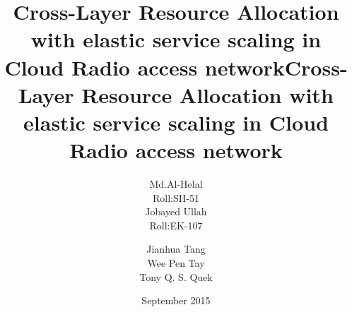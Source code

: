 \documentclass{beamer}
\begin{document}
  \title{Cross-Layer  Resource  Allocation with  elastic service scaling in Cloud Radio access network}
  \author{\parbox{2.5cm}{\centering Md.Al-Helal\\Roll:SH-51}\hspace{1cm}\parbox{2.5cm}{\centering Jobayed Ullah\\Roll:EK-107}}
\begin{frame}
  \maketitle
\end{frame}
  \title{Cross-Layer  Resource  Allocation with  elastic service scaling in Cloud Radio access network}
  \author{Jianhua Tang\\ Wee Pen Tay\\ Tony Q. S. Quek}
\date{September 2015}
\begin{frame}
  \maketitle
\end{frame}
\end{document}
